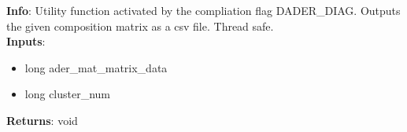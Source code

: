 \textbf{Info}: Utility function activated by the compliation flag DADER\_DIAG.
Outputs the given composition matrix as a csv file. Thread safe.\\

\noindent \textbf{Inputs}:
\begin{itemize}
\item{long ader\_mat\_matrix\_data}
\item{long cluster\_num}
\end{itemize}

\noindent \textbf{Returns}: void
